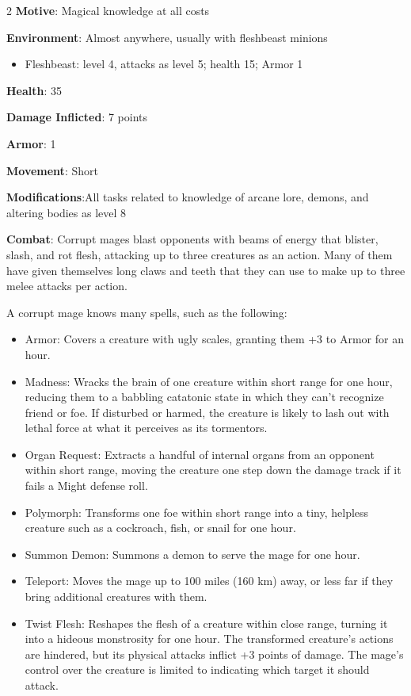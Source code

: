 \begin{multicols}{2}
\textbf{Motive}: Magical knowledge at all costs 

\textbf{Environment}: Almost anywhere, usually with fleshbeast minions 

\begin{itemize}
\item Fleshbeast: level 4, attacks as level 5; health 15; Armor 1
\end{itemize}

\textbf{Health}: 35 

\textbf{Damage Inflicted}: 7 points 

\textbf{Armor}: 1 

\textbf{Movement}: Short 

\textbf{Modifications}:All tasks related to knowledge of arcane lore, demons, and altering bodies as level 8 

\textbf{Combat}: Corrupt mages blast opponents with beams of energy that blister, slash, and rot flesh, attacking up to three creatures as an action. Many of them have given themselves long claws and teeth that they can use to make up to three melee attacks per action. 

A corrupt mage knows many spells, such as the following:

\begin{itemize}
\item Armor: Covers a creature with ugly scales, granting them +3 to Armor for an hour. 
\item Madness: Wracks the brain of one creature within short range for one hour, reducing them to a babbling catatonic state in which they can’t recognize friend or foe. If disturbed or harmed, the creature is likely to lash out with lethal force at what it perceives as its tormentors. 
\item Organ Request: Extracts a handful of internal organs from an opponent within short range, moving the creature one step down the damage track if it fails a Might defense roll. 
\item Polymorph: Transforms one foe within short range into a tiny, helpless creature such as a cockroach, fish, or snail for one hour. 
\item Summon Demon: Summons a demon to serve the mage for one hour. 
\item Teleport: Moves the mage up to 100 miles (160 km) away, or less far if they bring additional creatures with them. 
\item Twist Flesh: Reshapes the flesh of a creature within close range, turning it into a hideous monstrosity for one hour. The transformed creature’s actions are hindered, but its physical attacks inflict +3 points of damage. The mage’s control over the creature is limited to indicating which target it should attack. 
\end{itemize}


\end{multicols}
